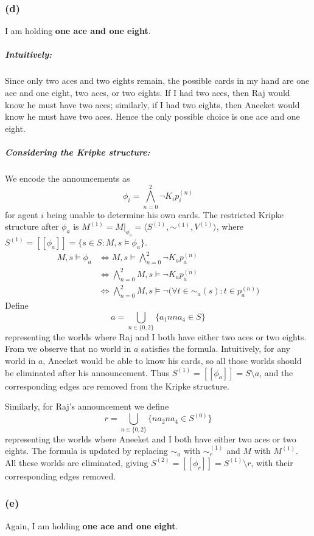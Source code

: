 \subsubsection*{(d)}
I am holding \textbf{one ace and one eight}.

\subparagraph*{Intuitively:}
Since only two aces and two eights remain,
the possible cards in my hand are one ace and one eight,
two aces, or two eights. If I had two aces, then Raj
would know he must have two aces; similarly, if I had
two eights, then Aneeket would know he must have two aces.
Hence the only possible choice is one ace and one eight.

\subparagraph*{Considering the Kripke structure:}
We encode the announcements as
\[
\phi_i = \bigwedge_{n=0}^{2} \neg K_i p_{i}^{(n)}
\]
for agent $i$ being unable to determine his own cards.
The restricted Kripke structure after $\phi_a$ is
$M^{(1)} = M|_{\phi_a} = \langle S^{(1)}, \sim^{(1)}, 
V^{(1)} \rangle$,
where $S^{(1)} = [\![ \phi_a ]\!] = \{ s \in S : 
M,s \models \phi_a \}$.
\begin{align*}
    M,s \models \phi_a
    &\iff M,s \models \bigwedge_{n=0}^{2} 
        \neg K_a p_{a}^{(n)} \\
    &\iff \bigwedge_{n=0}^{2} M,s \models 
        \neg K_a p_{a}^{(n)} \\
    &\iff \bigwedge_{n=0}^{2} M,s \models 
        \neg \bigl( \forall t \in \sim_a(s) : 
            t \in p_{a}^{(n)} \bigr)
        \tag{1.3(c2)}\label{eq:1.3(c2)}
\end{align*}
Define
\[
a = \bigcup_{n \in \{0,2\}} \{ a_1 n n a_4 \in S \}
\]
representing the worlds where Raj and I 
both have either two aces or two eights.
From  we observe that no world in 
$a$ satisfies the formula.
Intuitively, for any world in $a$,
 Aneeket would be able to know his cards, 
 so all those worlds should be eliminated after 
 his announcement.
Thus $S^{(1)} = [\![ \phi_a ]\!] = S \setminus a$, 
and the corresponding edges are removed from 
the Kripke structure.

Similarly, for Raj's announcement we define
\[
r = \bigcup_{n \in \{0,2\}} \{ n a_2 n a_4 \in S^{(0)} \}
\]
representing the worlds where Aneeket and I both 
have either two aces or two eights.
The formula  is updated by replacing 
$\sim_a$ with $\sim_r^{(1)}$ and $M$ with $M^{(1)}$.
All these worlds are eliminated, giving $S^{(2)} = 
[\![ \phi_r ]\!] = S^{(1)} \setminus r$, 
with their corresponding edges removed.

\subsubsection*{(e)}
Again, I am holding \textbf{one ace and one eight}.

